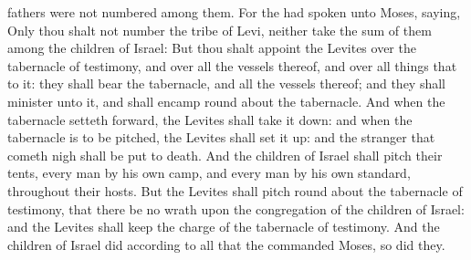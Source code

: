 {fathers were not
numbered
among them.
For the
{} had
spoken unto
Moses,
saying,
Only thou shalt not
number the
tribe of
Levi, neither
take the
sum of them
among the
children of
Israel:
But thou shalt
appoint the
Levites over the
tabernacle of
testimony, and over all the
vessels thereof, and over all things that
{} to it: they shall
bear the
tabernacle, and all the
vessels thereof; and they shall
minister unto it, and shall
encamp round
about the
tabernacle.
And when the
tabernacle setteth
forward, the
Levites shall take it
down: and when the
tabernacle is to be
pitched, the
Levites shall set it
up: and the
stranger that cometh
nigh shall be put to
death.
And the
children of
Israel shall pitch their
tents, every
man by his own
camp, and every
man by his own
standard, throughout their
hosts.
But the
Levites shall
pitch round
about the
tabernacle of
testimony, that there be no
wrath upon the
congregation of the
children of
Israel: and the
Levites shall
keep the
charge of the
tabernacle of
testimony.
And the
children of
Israel
did according to all that the
{}
commanded
Moses, so
did they.

}
